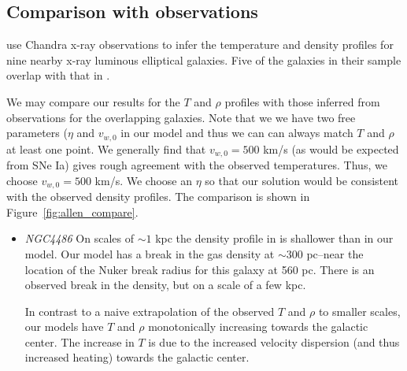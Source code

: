 \documentclass[usenatbib,fleqn]{mn2e}
\newcommand{\vwO}{v_{w,0}}
\begin{document}

\subsection{Comparison with observations}
\citealt{AllenDunn+:2006a} use Chandra x-ray observations to infer the temperature and density profiles for nine nearby x-ray luminous elliptical galaxies.  Five of the galaxies in their sample overlap with that in . 

We may compare our results for the $T$ and $\rho$ profiles with those inferred from observations for the overlapping galaxies.  Note that we we have two free parameters ($\eta$ and $\vwO$ in our model and thus we can can always match $T$ and $\rho$ at least one point.  We generally find that $\vwO=500$ km/s (as would be expected from SNe Ia) gives rough agreement with the observed temperatures.  Thus, we choose $\vwO=500$ km/s.  We choose an $\eta$ so that our solution would be consistent with the observed density profiles. The comparison is shown in Figure~\ref{fig:allen_compare}.


\begin{itemize}
\item \emph{NGC4486} %
On scales of $\sim1$ kpc the density profile in \citealt{AllenDunn+:2006a}  is shallower than in our model. Our model has a break in the gas density at $\sim 300$ pc--near the location of the Nuker break radius for this galaxy at 560 pc. There is an observed break in the density, but on a scale of a few kpc.

In contrast to a naive extrapolation of the observed $T$ and $\rho$ to smaller scales, our models have $T$ and $\rho$ monotonically increasing towards the galactic center. The increase in $T$ is due to the increased velocity dispersion (and thus increased heating) towards the galactic center.
\end{itemize}
\end{document}

